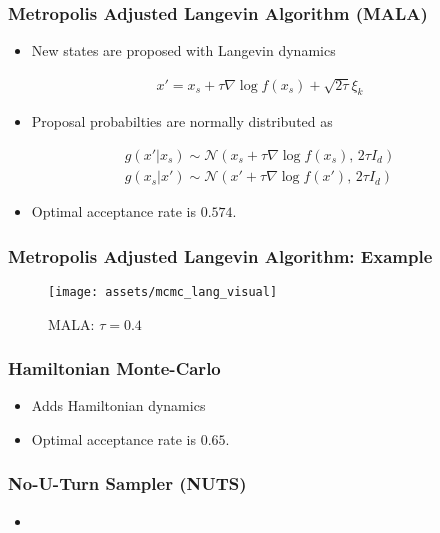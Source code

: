 \documentclass{beamer}
\begin{document}
\begin{frame}
  \frametitle{Metropolis Adjusted Langevin Algorithm (MALA)}
  \begin{itemize}
    \item New states are proposed with Langevin dynamics
  \end{itemize}
  \begin{gather*}
      x' = x_s + \tau \nabla \log f(x_s) + \sqrt{2 \tau} \xi_k
  \end{gather*}
  \begin{itemize}
    \item Proposal probabilties are normally distributed as
  \end{itemize}
  \begin{gather*}
    g(x'| x_s) \sim \mathcal{N}(x_s + \tau \nabla \log f(x_s), \, 2 \tau  I_d) \\
    g(x_s | x') \sim \mathcal{N}(x' + \tau \nabla \log f(x'), \, 2 \tau  I_d)
  \end{gather*}
  \begin{itemize}
    \item Optimal acceptance rate is $0.574$.
  \end{itemize}
\end{frame}

\begin{frame}
  \frametitle{Metropolis Adjusted Langevin Algorithm: Example}
  \begin{figure}
    \centering
    \texttt{[image: assets/mcmc\_lang\_visual]}
    \caption{MALA: $\tau=0.4$}
  \end{figure}
\end{frame}


\begin{frame}
  \frametitle{Hamiltonian Monte-Carlo}
  \begin{itemize}
    \item Adds Hamiltonian dynamics
    \item Optimal acceptance rate is $0.65$.
  \end{itemize}
\end{frame}

\begin{frame}
  \frametitle{No-U-Turn Sampler (NUTS)}
  \begin{itemize}
    \item
  \end{itemize}
\end{frame}


\end{document}
